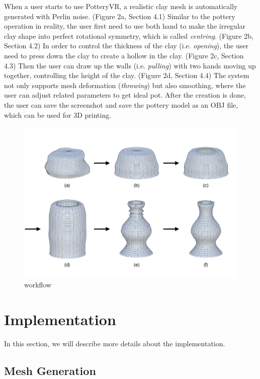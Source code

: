 When a user starts to use PotteryVR, a realistic clay mesh is automatically generated with Perlin noise. (Figure 2a, Section 4.1)
Similar to the pottery operation in reality, the user first need to use both hand to make the irregular clay shape into perfect rotational symmetry, which is called \textit{centring}. (Figure 2b, Section 4.2)
In order to control the thickness of the clay (i.e. \textit{opening}), the user need to press down the clay to create a hollow in the clay. (Figure 2c, Section 4.3)
Then the user can draw up the walls (i.e. \textit{pulling}) with two hands moving up together, controlling the height of the clay. (Figure 2d, Section 4.4)
The system not only supports mesh deformation (\textit{throwing}) but also smoothing, where the user can adjust related parameters to get ideal pot.
After the creation is done, the user can save the screenshot and save the pottery model as an OBJ file, which can be used for 3D printing.
\begin{figure}
  \includegraphics[width=\textwidth]{fig2.pdf}
\caption{workflow}
\label{fig:1}       %
\end{figure}


\section{Implementation}
\label{sec:4}

In this section, we will describe more details about the implementation. 

\subsection{Mesh Generation}
\label{sec:4.1}

